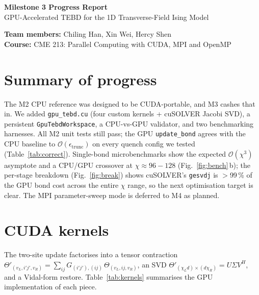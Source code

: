\documentclass[11pt]{article}
\begin{document}
\begin{center}
{\Large\bfseries Milestone 3 Progress Report}\\[2pt]
GPU-Accelerated TEBD for the 1D Transverse-Field Ising Model
\end{center}

\textbf{Team members:} Chiling Han, Xin Wei, Hercy Shen\\
\textbf{Course:} CME 213: Parallel Computing with CUDA, MPI and OpenMP

\section{Summary of progress} The M2 CPU reference was designed to be
CUDA-portable, and M3 cashes that in. We added \texttt{gpu\_tebd.cu}
(four custom kernels + cuSOLVER Jacobi SVD), a persistent
\texttt{GpuTebdWorkspace}, a CPU-vs-GPU validator, and two benchmarking
harnesses. All M2 unit tests still pass; the GPU \texttt{update\_bond}
agrees with the CPU baseline to $\mathcal{O}(\epsilon_\text{trunc})$ on
every quench config we tested (Table~\ref{tab:correct}). Single-bond
microbenchmarks show the expected $\mathcal{O}(\chi^3)$ asymptote and a
CPU/GPU crossover at $\chi\!\approx\!96{-}128$
(Fig.~\ref{fig:bench}\,b); the per-stage breakdown
(Fig.~\ref{fig:break}) shows cuSOLVER's \texttt{gesvdj} is $>$99\,\% of
the GPU bond cost across the entire $\chi$ range, so the next
optimisation target is clear. The MPI parameter-sweep mode is deferred
to M4 as planned.

\section{CUDA kernels}
The two-site update factorises into a tensor contraction
$\Theta'_{(v_L,i'j',v_R)} = \sum_{ij} G_{(i'j'),(ij)}\,\Theta_{(v_L,ij,v_R)}$,
an SVD $\Theta'_{(\chi_L d)\times(d\chi_R)} = U\Sigma V^{H}$, and a
Vidal-form restore. Table~\ref{tab:kernels} summarises the GPU
implementation of each piece.
\end{document}
